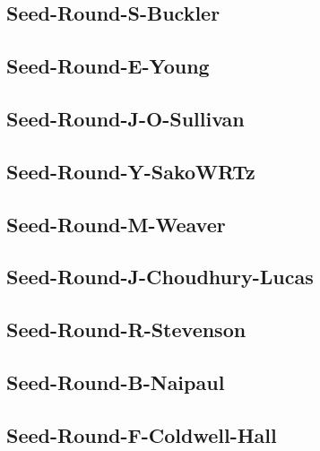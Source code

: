 \documentclass[letterpaper,10pt,openany,oneside,english]{sphinxmanual}
\begin{document}
\subsection{Seed-Round-S-Buckler}
\label{\detokenize{statements:seed-round-s-buckler}}

\subsection{Seed-Round-E-Young}
\label{\detokenize{statements:seed-round-e-young}}

\subsection{Seed-Round-J-O-Sullivan}
\label{\detokenize{statements:seed-round-j-o-sullivan}}

\subsection{Seed-Round-Y-SakoWRTz}
\label{\detokenize{statements:seed-round-y-sakowrtz}}

\subsection{Seed-Round-M-Weaver}
\label{\detokenize{statements:seed-round-m-weaver}}

\subsection{Seed-Round-J-Choudhury-Lucas}
\label{\detokenize{statements:seed-round-j-choudhury-lucas}}

\subsection{Seed-Round-R-Stevenson}
\label{\detokenize{statements:seed-round-r-stevenson}}

\subsection{Seed-Round-B-Naipaul}
\label{\detokenize{statements:seed-round-b-naipaul}}

\subsection{Seed-Round-F-Coldwell-Hall}
\label{\detokenize{statements:seed-round-f-coldwell-hall}}
\end{document}

